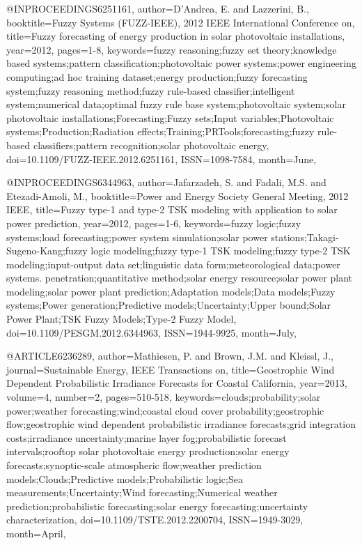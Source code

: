 @INPROCEEDINGS{6251161, 
author={D'Andrea, E. and Lazzerini, B.}, 
booktitle={Fuzzy Systems (FUZZ-IEEE), 2012 IEEE International Conference on}, 
title={Fuzzy forecasting of energy production in solar photovoltaic installations}, 
year={2012}, 
pages={1-8}, 
keywords={fuzzy reasoning;fuzzy set theory;knowledge based systems;pattern classification;photovoltaic power systems;power engineering computing;ad hoc training dataset;energy production;fuzzy forecasting system;fuzzy reasoning method;fuzzy rule-based classifier;intelligent system;numerical data;optimal fuzzy rule base system;photovoltaic system;solar photovoltaic installations;Forecasting;Fuzzy sets;Input variables;Photovoltaic systems;Production;Radiation effects;Training;PRTools;forecasting;fuzzy rule-based classifiers;pattern recognition;solar photovoltaic energy}, 
doi={10.1109/FUZZ-IEEE.2012.6251161}, 
ISSN={1098-7584}, 
month={June},}

@INPROCEEDINGS{6344963, 
author={Jafarzadeh, S. and Fadali, M.S. and Etezadi-Amoli, M.}, 
booktitle={Power and Energy Society General Meeting, 2012 IEEE}, 
title={Fuzzy type-1 and type-2 TSK modeling with application to solar power prediction}, 
year={2012}, 
pages={1-6}, 
keywords={fuzzy logic;fuzzy systems;load forecasting;power system simulation;solar power stations;Takagi-Sugeno-Kang;fuzzy logic modeling;fuzzy type-1 TSK modeling;fuzzy type-2 TSK modeling;input-output data set;linguistic data form;meteorological data;power systems. penetration;quantitative method;solar energy resource;solar power plant modeling;solar power plant prediction;Adaptation models;Data models;Fuzzy systems;Power generation;Predictive models;Uncertainty;Upper bound;Solar Power Plant;TSK Fuzzy Models;Type-2 Fuzzy Model}, 
doi={10.1109/PESGM.2012.6344963}, 
ISSN={1944-9925}, 
month={July},}

@ARTICLE{6236289, 
author={Mathiesen, P. and Brown, J.M. and Kleissl, J.}, 
journal={Sustainable Energy, IEEE Transactions on}, 
title={Geostrophic Wind Dependent Probabilistic Irradiance Forecasts for Coastal California}, 
year={2013}, 
volume={4}, 
number={2}, 
pages={510-518}, 
keywords={clouds;probability;solar power;weather forecasting;wind;coastal cloud cover probability;geostrophic flow;geostrophic wind dependent probabilistic irradiance forecasts;grid integration costs;irradiance uncertainty;marine layer fog;probabilistic forecast intervals;rooftop solar photovoltaic energy production;solar energy forecasts;synoptic-scale atmospheric flow;weather prediction models;Clouds;Predictive models;Probabilistic logic;Sea measurements;Uncertainty;Wind forecasting;Numerical weather prediction;probabilistic forecasting;solar energy forecasting;uncertainty characterization}, 
doi={10.1109/TSTE.2012.2200704}, 
ISSN={1949-3029}, 
month={April},}


